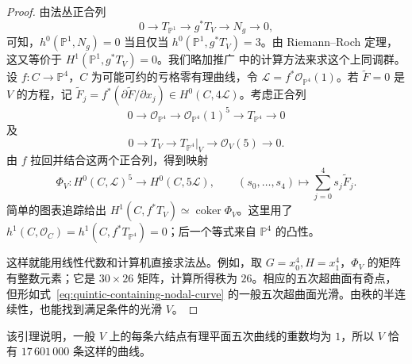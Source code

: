 \begin{proof}
由法丛正合列
\begin{equation}\label{eq:nodal-normalization-tangent-sequence}
0\longrightarrow T_{\mathbb P^1}\longrightarrow g^*T_V\longrightarrow N_g\longrightarrow0,
\end{equation}
可知，$h^0(\mathbb P^1,N_g)=0$ 当且仅当 $h^0(\mathbb P^1,g^*T_V)=3$。由 Riemann--Roch 定理，这又等价于 $H^1(\mathbb P^1,g^*T_V)=0$。我们略加推广  中的计算方法来求这个上同调群。设 $f:C\to\mathbb P^4$，$C$ 为可能可约的亏格零有理曲线，令 $\mathcal L=f^*\mathcal O_{\mathbb P^4}(1)$。若 $\widetilde F=0$ 是 $V$ 的方程，记 $\widetilde F_j=f^*(\partial\widetilde F/\partial x_j)\in H^0(C,4\mathcal L)$。考虑正合列
\[
0\longrightarrow\mathcal O_{\mathbb P^4}\longrightarrow\mathcal O_{\mathbb P^4}(1)^5\longrightarrow T_{\mathbb P^4}\longrightarrow0
\]
及
\[
0\longrightarrow T_V\longrightarrow T_{\mathbb P^4}|_V\longrightarrow\mathcal O_V(5)\longrightarrow0.
\]
由 $f$ 拉回并结合这两个正合列，得到映射
\[
\Phi_V:H^0(C,\mathcal L)^5\longrightarrow H^0(C,5\mathcal L),\qquad
(s_0,\ldots,s_4)\longmapsto\sum_{j=0}^4s_j\widetilde F_j.
\]
简单的图表追踪给出 $H^1(C,f^*T_V)\simeq\operatorname{coker}\Phi_V$。这里用了 $h^1(C,\mathcal O_C)=h^1(C,f^*T_{\mathbb P^4})=0$；后一个等式来自 $\mathbb P^4$ 的凸性。

这样就能用线性代数和计算机直接求法丛。例如，取 $G=x_0^4,H=x_1^4$，$\Phi_V$ 的矩阵有整数元素；它是 $30\times26$ 矩阵，计算所得秩为 $26$。相应的五次超曲面有奇点，但形如式~\eqref{eq:quintic-containing-nodal-curve} 的一般五次超曲面光滑。由秩的半连续性，也能找到满足条件的光滑 $V$。
\end{proof}

该引理说明，一般 $V$ 上的每条六结点有理平面五次曲线的重数均为 $1$，所以 $V$ 恰有 $17\,601\,000$ 条这样的曲线。

